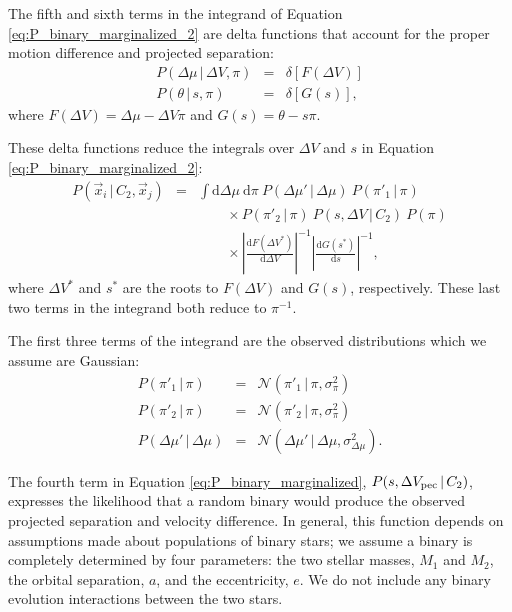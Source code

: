 \documentclass[usenatbib]{mnras}
\newcommand{\given}{\,|\,}
\newcommand{\dd}{\mathrm{d}}
\begin{document}
The fifth and sixth terms in the integrand of Equation \ref{eq:P_binary_marginalized_2} are delta functions that account for the proper motion difference and projected separation:
\begin{eqnarray}
P(\Delta \mu \given \Delta V, \pi) &=& \delta \left[ F(\Delta V) \right] \\ 
P(\theta \given s, \pi) &=& \delta \left[ G(s) \right], 
\end{eqnarray}
where $F(\Delta V) = \Delta \mu - \Delta V \pi$ and $G(s) = \theta - s \pi$. 

These delta functions reduce the integrals over $\Delta V$ and $s$ in Equation \ref{eq:P_binary_marginalized_2}:
\begin{eqnarray}
P(\vec{x}_i \given C_2, \vec{x}_j) &=& \int \dd \Delta \mu\ \dd \pi\ P(\Delta \mu' \given \Delta \mu)\ P(\pi'_1 \given \pi) \nonumber \\
& & \qquad \times P(\pi'_2 \given \pi)\ P(s, \Delta V \given C_2)\ P(\pi) \nonumber \\
& & \qquad \times  \left| \frac{\dd F(\Delta V^*)}{\dd \Delta V} \right|^{-1} \left| \frac{\dd G(s^*)}{\dd s} \right|^{-1}, \label{eq:P_binary_marginalized}
\end{eqnarray}
where $\Delta V^*$ and $s^*$ are the roots to $F(\Delta V)$ and $G(s)$, respectively. These last two terms in the integrand both reduce to $\pi^{-1}$.




The first three terms of the integrand are the observed distributions which we assume are Gaussian:
\begin{eqnarray}
P(\pi'_1 \given \pi) &=& \mathcal{N}(\pi'_1 \given \pi, \sigma^2_{\pi}) \\
P(\pi'_2 \given \pi) &=& \mathcal{N}(\pi'_2 \given \pi, \sigma^2_{\pi}) \\
P(\Delta \mu' \given \Delta \mu) &=& \mathcal{N}( \Delta \mu' \given \Delta \mu, \sigma^2_{\Delta \mu} ).
\end{eqnarray}



The fourth term in Equation \ref{eq:P_binary_marginalized}, $P(s, \Delta V_{\rm pec} \given C_2)$, expresses the likelihood that a random binary would produce the observed projected separation and velocity difference. In general, this function depends on assumptions made about populations of binary stars; we assume a binary is completely determined by four parameters: the two stellar masses, $M_1$ and $M_2$, the orbital separation, $a$, and the eccentricity, $e$. We do not include any binary evolution interactions between the two stars. 
\end{document}
